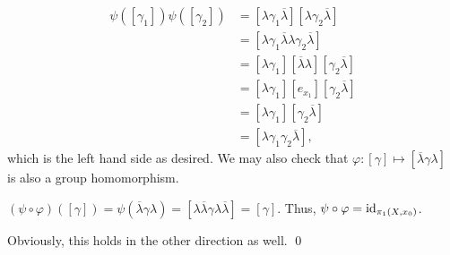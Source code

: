 \begin{align*}
    \psi([\gamma_1]) \psi([\gamma_2]) &= [\lambda \gamma_1 \overline{\lambda}] [\lambda \gamma_2 \overline{\lambda}] \\
    &= [\lambda \gamma_1 \overline{\lambda} \lambda \gamma_2 \overline{\lambda}] \\
    &= [\lambda \gamma_1] [\overline{\lambda} \lambda]  [\gamma_2 \overline{\lambda}] \\
    &= [\lambda \gamma_1] [e_{x_1}] [\gamma_2 \overline{\lambda}] \\
    &= [\lambda \gamma_1] [\gamma_2 \overline{\lambda}] \\
    &= [\lambda \gamma_1 \gamma_2 \overline{\lambda}],
\end{align*}
which is the left hand side as desired. We may also check that $\varphi : [\gamma] \mapsto [\overline{\lambda} \gamma \lambda]$ is also a group homomorphism.
\begin{simpleclaim}
    $(\psi \circ \varphi)([\gamma]) = \psi(\overline{\lambda} \gamma \lambda) = [\lambda \overline{\lambda} \gamma \lambda \overline{\lambda}] = [\gamma]$. Thus, $\psi \circ \varphi = \mathrm{id}_{\pi_1(X, x_0)}$.
\end{simpleclaim}
\noindent Obviously, this holds in the other direction as well. \qed

